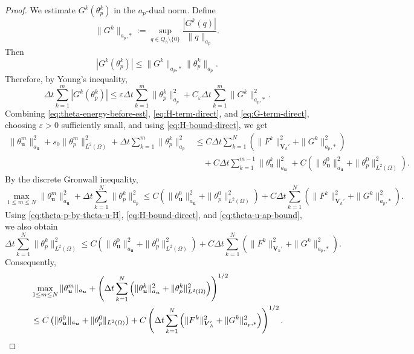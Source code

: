 \documentclass{amsart}
\newcommand{\LRp}[1]{\left( #1 \right)}
\begin{document}
\begin{proof}
We estimate $G^k(\theta_p^k)$ in the $a_p$-dual norm. Define
\[
        \|G^k\|_{a_p,*}
        :=
        \sup_{q\in Q_h\setminus\{0\}}
        \frac{|G^k(q)|}{\|q\|_{a_p}}.
\]
Then
\[
        |G^k(\theta_p^k)|
        \le
        \|G^k\|_{a_p,*}\|\theta_p^k\|_{a_p}.
\]
Therefore, by Young's inequality,
\begin{equation}
\label{eq:G-term-direct}
\Delta t\sum_{k=1}^m
|G^k(\theta_p^k)|
\le
\varepsilon
\Delta t\sum_{k=1}^m
\|\theta_p^k\|_{a_p}^2
+
C_\varepsilon
\Delta t\sum_{k=1}^m
\|G^k\|_{a_p,*}^2 .
\end{equation}
Combining \eqref{eq:theta-energy-before-est},
\eqref{eq:H-term-direct}, and \eqref{eq:G-term-direct}, choosing
$\varepsilon>0$ sufficiently small, and using \eqref{eq:H-bound-direct},
we get
\[
\begin{aligned}
\|\theta_{\boldsymbol u}^m\|_{a_{\boldsymbol u}}^2
+
s_0\|\theta_p^m\|_{L^2(\Omega)}^2
+
\Delta t\sum_{k=1}^m
\|\theta_p^k\|_{a_p}^2
&\le
C
\Delta t\sum_{k=1}^N
\left(
\|F^k\|_{\boldsymbol V_h'}^2
+
\|G^k\|_{a_p,*}^2
\right)
\\
&\quad
+
C\Delta t
\sum_{k=1}^{m-1}
\|\theta_{\boldsymbol u}^k\|_{a_{\boldsymbol u}}^2 + C(\|\theta_{\boldsymbol u}^0\|_{a_{\boldsymbol u}}^2
+
\|\theta_p^0\|_{L^2(\Omega)}^2) .
\end{aligned}
\]
By the discrete Gronwall inequality,
\begin{equation}
\label{eq:theta-u-ap-bound}
\max_{1\le m\le N}
\|\theta_{\boldsymbol u}^m\|_{a_{\boldsymbol u}}^2
+
\Delta t\sum_{k=1}^N
\|\theta_p^k\|_{a_p}^2
\le C \LRp{\|\theta_{\boldsymbol u}^0\|_{a_{\boldsymbol u}}^2
+
\|\theta_p^0\|_{L^2(\Omega)}^2} +
C
\Delta t\sum_{k=1}^N
\left(
\|F^k\|_{\boldsymbol V_h'}^2
+
\|G^k\|_{a_p,*}^2
\right).
\end{equation}
Using \eqref{eq:theta-p-by-theta-u-H},
\eqref{eq:H-bound-direct}, and \eqref{eq:theta-u-ap-bound}, we also obtain
\begin{equation}
\label{eq:theta-p-L2-bound}
\Delta t\sum_{k=1}^N
\|\theta_p^k\|_{L^2(\Omega)}^2
\le C \LRp{\|\theta_{\boldsymbol u}^0\|_{a_{\boldsymbol u}}^2
+
\|\theta_p^0\|_{L^2(\Omega)}^2} + 
C
\Delta t\sum_{k=1}^N
\left(
\|F^k\|_{\boldsymbol V_h'}^2
+
\|G^k\|_{a_p,*}^2
\right).
\end{equation}
%
Consequently,
%
\begin{align}
\label{eq:theta-final-stability}
&\max_{1\le m\le N}
\|\theta_{\boldsymbol u}^m\|_{a_{\boldsymbol u}} +
\left(
\Delta t\sum_{k=1}^N
\left(
\|\theta_{\boldsymbol u}^k\|_{a_{\boldsymbol u}}^2
+
\|\theta_p^k\|_{L^2(\Omega)}^2
\right)
\right)^{1/2}
\\
\notag
&\le C \LRp{\|\theta_{\boldsymbol u}^0\|_{a_{\boldsymbol u}} + \|\theta_p^0\|_{L^2(\Omega)}} + 
C
\left(
\Delta t\sum_{k=1}^N
\left(
\|F^k\|_{\boldsymbol V_h'}^2
+
\|G^k\|_{a_p,*}^2
\right)
\right)^{1/2}.
\end{align}


\end{proof}
\end{document}
